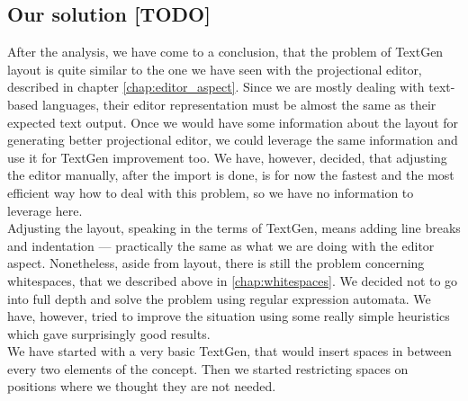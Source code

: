 \subsection{Our solution [TODO]}
\label{chap:textgen_solution}

After the analysis, we have come to a conclusion, that the problem of TextGen layout is quite similar to the one we have seen with the projectional editor, described in chapter \ref{chap:editor_aspect}.
Since we are mostly dealing with text-based languages, their editor representation must be almost the same as their expected text output.
Once we would have some information about the layout for generating better projectional editor, we could leverage the same information and use it for TextGen improvement too.
We have, however, decided, that adjusting the editor manually, after the import is done, is for now the fastest and the most efficient way how to deal with this problem, so we have no information to leverage here.
\\

Adjusting the layout, speaking in the terms of TextGen, means adding line breaks and indentation --- practically the same as what we are doing with the editor aspect.
Nonetheless, aside from layout, there is still the problem concerning whitespaces, that we described above in \ref{chap:whitespaces}.
We decided not to go into full depth and solve the problem using regular expression automata.
We have, however, tried to improve the situation using some really simple heuristics which gave surprisingly good results.
\\

We have started with a very basic TextGen, that would insert spaces in between every two elements of the concept.
Then we started restricting spaces on positions where we thought they are not needed.

